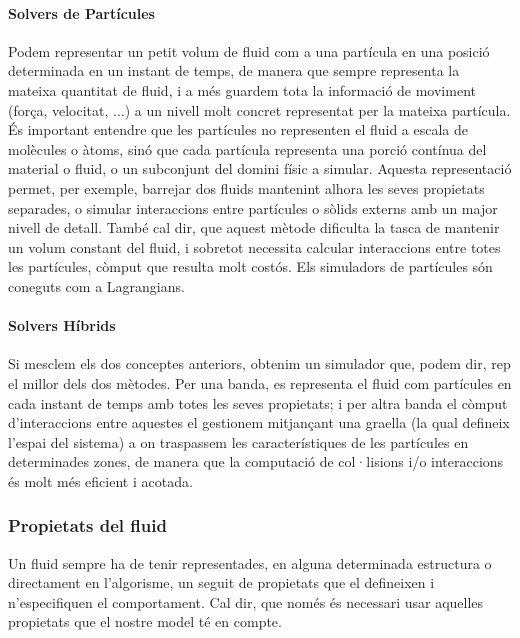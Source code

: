\documentclass[a4paper]{report}
\begin{document}
	\paragraph[Partícules]{Solvers de Partícules} Podem representar un petit volum de fluid com a una partícula en una posició determinada en un instant de temps, de manera que sempre representa la mateixa quantitat de fluid, i a més guardem tota la informació de moviment (força, velocitat, ...) a un nivell molt concret representat per la mateixa partícula. \newline
	És important entendre que les partícules no representen el fluid a escala de molècules o àtoms, sinó que cada partícula representa una porció contínua del material o fluid, o un subconjunt del domini físic a simular.
	\newline
	Aquesta representació permet, per exemple, barrejar dos fluids mantenint alhora les seves propietats separades, o simular interaccions entre partícules o sòlids externs amb un major nivell de detall.
	També cal dir, que aquest mètode dificulta la tasca de mantenir un volum constant del fluid, i sobretot necessita calcular interaccions entre totes les partícules, còmput que resulta molt costós. \newline
	Els simuladors de partícules són coneguts com a Lagrangians.
	
	\paragraph[Híbrids]{Solvers Híbrids} Si mesclem els dos conceptes anteriors, obtenim un simulador que, podem dir, rep el millor dels dos mètodes.\newline
	Per una banda, es representa el fluid com partícules en cada instant de temps amb totes les seves propietats; i per altra banda el còmput d'interaccions entre aquestes el gestionem mitjançant una graella (la qual defineix l'espai del sistema) a on traspassem les característiques de les partícules en determinades zones, de manera que la computació de col·lisions i/o interaccions és molt més eficient i acotada.
	
	\subsubsection{Propietats del fluid} 
	Un fluid sempre ha de tenir representades, en alguna determinada estructura o directament en l'algorisme, un seguit de propietats que el defineixen i n'especifiquen el comportament. Cal dir, que només és necessari usar aquelles propietats que el nostre model té en compte.
\end{document}
